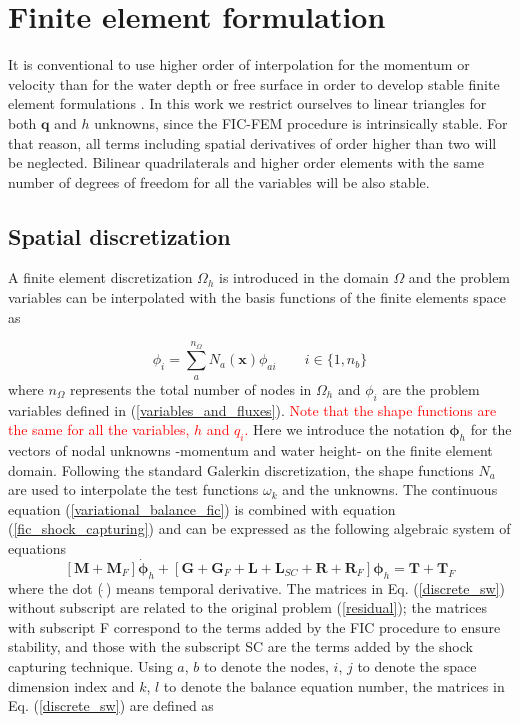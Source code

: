\documentclass[a4paper,12pt]{elsarticle}
\newcommand{\Miguel}[1]{\textcolor{red}{#1}}
\begin{document}
\section{Finite element formulation}
\label{sec:fem} 

It is conventional to use higher order of interpolation for the momentum or velocity than for the water depth or free surface in order to develop stable finite element formulations \cite{hood1974,heniche2000,bercovier1979}. In this work we restrict ourselves to linear triangles for both $\mathbf{q}$ and $h$ unknowns, since the FIC-FEM procedure is intrinsically stable. For that reason, all terms including spatial derivatives of order higher than two will be neglected. Bilinear quadrilaterals and higher order elements with the same number of degrees of freedom for all the variables will be also stable.


\subsection{Spatial discretization}

A finite element discretization $\Omega_h$ is introduced in the domain $\Omega$ and the problem variables can be interpolated with the basis functions of the finite elements space as

\begin{equation}
\phi_i = \sum_a^{n_\Omega} N_a(\mathbf{x})\phi_{ai} \qquad i \in \{1,n_b\}
\end{equation}
where $n_\Omega$ represents the total number of nodes in $\Omega_h$ and $\phi_i$ are the problem variables defined in (\ref{variables_and_fluxes}).
\Miguel{Note that the shape functions are the same for all the variables, $h$ and $q_i$.}
Here we introduce the notation $\bm{\phi}_h$ for the vectors of nodal unknowns -momentum and water height- on the finite element domain. Following the standard Galerkin discretization, the shape functions $N_a$ are used to interpolate the test functions $\omega_k$ and the unknowns. The continuous equation (\ref{variational_balance_fic}) is combined with equation (\ref{fic_shock_capturing}) and can be expressed as the following algebraic system of equations
\begin{equation} \label{discrete_sw}
[\mathbf{M} + \mathbf{M}_F] \dot{\bm{\phi}}_h
+ [\mathbf{G} + \mathbf{G}_F + \mathbf{L} + \mathbf{L}_{SC} + \mathbf{R} + \mathbf{R}_F] \bm{\phi}_h
= \mathbf{T} + \mathbf{T}_F
\end{equation}
where the dot ($\dot{\ }$) means temporal derivative. The matrices in Eq. (\ref{discrete_sw}) without subscript are related to the original problem (\ref{residual}); the matrices with subscript F correspond to the terms added by the FIC procedure to ensure stability, and those with the subscript SC are the terms added by the shock capturing technique. Using $a$, $b$ to denote the nodes, $i$, $j$ to denote the space dimension index and $k$, $l$ to denote the balance equation number, the matrices in Eq. (\ref{discrete_sw}) are defined as
\end{document}
